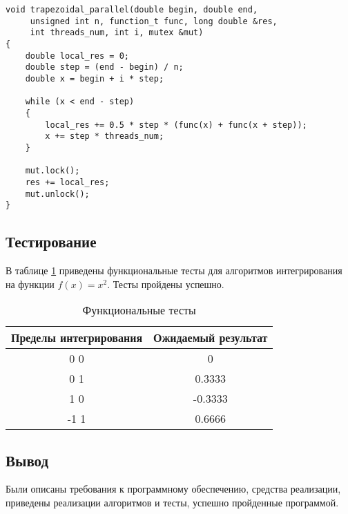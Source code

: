 \clearpage

\begin{lstlisting}[label=lst:int-trapez-par, caption=Параллельный алгоритм численного интегрирования методом трапеций при заданных n и номере потока]
void trapezoidal_parallel(double begin, double end, 
     unsigned int n, function_t func, long double &res, 
     int threads_num, int i, mutex &mut)
{
    double local_res = 0;
    double step = (end - begin) / n;
    double x = begin + i * step;

    while (x < end - step)
    {
        local_res += 0.5 * step * (func(x) + func(x + step));
        x += step * threads_num;
    }

    mut.lock();
    res += local_res;
    mut.unlock();
}
\end{lstlisting}

\subsection{Тестирование}

В таблице \ref{tab:tests} приведены функциональные тесты для алгоритмов
интегрирования на функции $f(x) = x^2$. Тесты пройдены успешно.

\begin{table}[h!]
	\begin{center}
    \begin{threeparttable}
        \captionsetup{justification=raggedright, singlelinecheck=off}
        \caption{\label{tab:tests}Функциональные тесты}
        \begin{tabular}{|c|c|}
			\hline
            \textbf{Пределы интегрирования} & \textbf{Ожидаемый результат} \\ [2mm]
            \hline
            0 0
            &
            0
            \\
            \hline
            0 1
            &
            0.3333
            \\
            \hline
            1 0
            &
            -0.3333
            \\
            \hline
            -1 1
            &
            0.6666
            \\
            \hline
		\end{tabular}
    \end{threeparttable} 
	\end{center}
\end{table}

\subsection*{Вывод}

Были описаны требования к программному обеспечению, средства реализации, приведены реализации алгоритмов и тесты, успешно пройденные программой.
